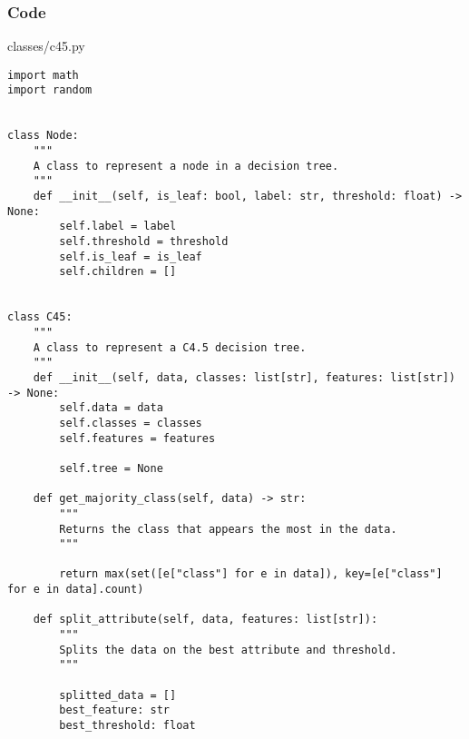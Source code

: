 \documentclass{beamer}
\begin{document}

\begin{frame}[fragile]
    \frametitle{Code}
    \scriptsize
    classes/c45.py \newline
    \fontsize{3pt}{5pt}\selectfont
    \begin{verbatim}
import math
import random


class Node:
    """
    A class to represent a node in a decision tree.
    """
    def __init__(self, is_leaf: bool, label: str, threshold: float) -> None:
        self.label = label
        self.threshold = threshold
        self.is_leaf = is_leaf
        self.children = []

        
class C45:
    """
    A class to represent a C4.5 decision tree.
    """
    def __init__(self, data, classes: list[str], features: list[str]) -> None:
        self.data = data
        self.classes = classes
        self.features = features

        self.tree = None

    def get_majority_class(self, data) -> str:
        """
        Returns the class that appears the most in the data.
        """

        return max(set([e["class"] for e in data]), key=[e["class"] for e in data].count)
    
    def split_attribute(self, data, features: list[str]):
        """
        Splits the data on the best attribute and threshold.
        """

        splitted_data = []
        best_feature: str
        best_threshold: float
    \end{verbatim}
\end{frame}
\end{document}
